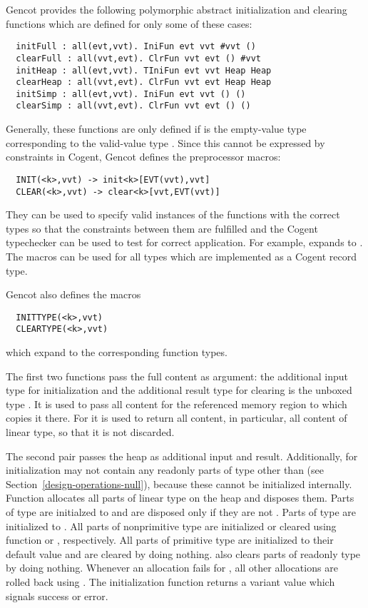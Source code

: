 Gencot provides the following polymorphic abstract initialization and clearing functions which are defined for only 
some of these cases:
\begin{verbatim}
  initFull : all(evt,vvt). IniFun evt vvt #vvt ()
  clearFull : all(vvt,evt). ClrFun vvt evt () #vvt
  initHeap : all(evt,vvt). TIniFun evt vvt Heap Heap
  clearHeap : all(vvt,evt). ClrFun vvt evt Heap Heap
  initSimp : all(evt,vvt). IniFun evt vvt () ()
  clearSimp : all(vvt,evt). ClrFun vvt evt () ()
\end{verbatim}
Generally, these functions are only defined if  is the empty-value type corresponding to the valid-value
type . Since this cannot be expressed by constraints in Cogent, Gencot defines the preprocessor macros:
\begin{verbatim}
  INIT(<k>,vvt) -> init<k>[EVT(vvt),vvt]
  CLEAR(<k>,vvt) -> clear<k>[vvt,EVT(vvt)]
\end{verbatim}
They can be used to specify valid instances of the functions with the correct types so that the constraints
between them are fulfilled and the Cogent typechecker can be used to test for correct application.
For example,  expands to . The macros can be used for 
all types  which are implemented as a Cogent record type.

Gencot also defines the macros
\begin{verbatim}
  INITTYPE(<k>,vvt)
  CLEARTYPE(<k>,vvt)
\end{verbatim}
which expand to the corresponding function types.

The first two functions pass the full content as argument: the additional input type for initialization and the additional
result type for clearing is the
unboxed type . It is used to pass all content for the referenced memory region to  which
copies it there. For  it is used to return all content, in particular, all content of linear type, so that 
it is not discarded.

The second pair passes the heap as additional input and result. Additionally, for initialization 
may not contain any readonly parts of type other than  (see Section~\ref{design-operations-null}), 
because these cannot be initialized internally. Function  allocates all parts of linear type on the heap 
and  disposes them. Parts of type  are initialzed to  and are disposed only 
if they are not . Parts of type  are initialized to .
All parts of nonprimitive type are
initialized or cleared using function  or , respectively.
All parts of primitive type are initialized to their default value  and are cleared by
doing nothing.  also clears parts of readonly type by doing nothing. Whenever an allocation fails for 
, all other allocations are rolled back using . The initialization function returns a variant
value which signals success or error.


